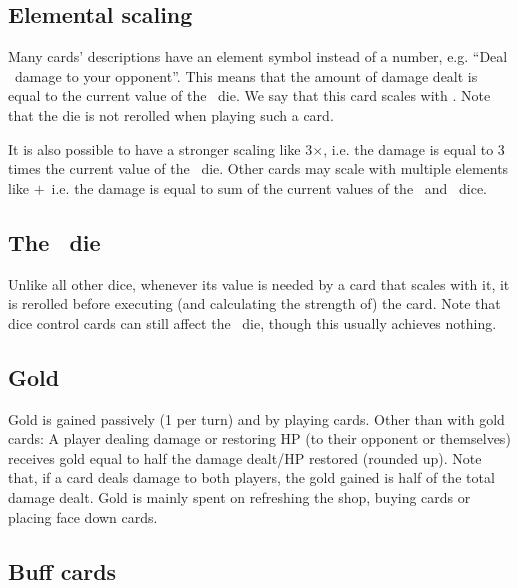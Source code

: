 \documentclass[dvipsnames,parskip,a4paper]{scrartcl}
\begin{document}
\subsection*{Elemental scaling}

Many cards' descriptions have an element symbol instead of a number, e.g. ``Deal \fire \ damage to your opponent''. This means that the amount of damage dealt is equal to the current value of the \fire \ die. We say that this card scales with \fire. Note that the die is not rerolled when playing such a card.

\vspace{4pt}

It is also possible to have a stronger scaling like 3\hspace{1pt}$\times$\hspace{1pt}\fire, i.e. the damage is equal to 3 times the current value of the \fire \ die. Other cards may scale with multiple elements like \earth\hspace{1pt}$+$\hspace{1pt}\chance \, i.e. the damage is equal to sum of the current values of the \earth \ and \chance \ dice.

\subsection*{The \chance \ die}

Unlike all other dice, whenever its value is needed by a card that scales with it, it is rerolled before executing (and calculating the strength of) the card. Note that dice control cards can still affect the \chance \ die, though this usually achieves nothing.

\subsection*{Gold}

Gold is gained passively (1 per turn) and by playing cards. Other than with gold cards: A player dealing damage or restoring HP (to their opponent or themselves) receives gold equal to half the damage dealt/HP restored (rounded up). Note that, if a card deals damage to both players, the gold gained is half of the total damage dealt. Gold is mainly spent on refreshing the shop, buying cards or placing face down cards.

\subsection*{Buff cards}
\end{document}
